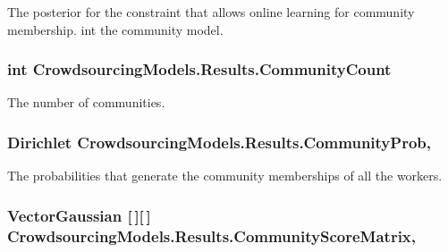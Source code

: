 The posterior for the constraint that allows online learning for community membership. int the community model. 

\hypertarget{class_crowdsourcing_models_1_1_results_a90fd0653bd49b69cc9f12ad7cfb3fa9c}{}
\subsubsection[{Community\+Count}]{\setlength{\rightskip}{0pt plus 5cm}int Crowdsourcing\+Models.\+Results.\+Community\+Count\hspace{0.3cm}{\ttfamily [get]}}\label{class_crowdsourcing_models_1_1_results_a90fd0653bd49b69cc9f12ad7cfb3fa9c}


The number of communities. 

\hypertarget{class_crowdsourcing_models_1_1_results_af44b21781d8413575f1196752ec04851}{}
\subsubsection[{Community\+Prob}]{\setlength{\rightskip}{0pt plus 5cm}Dirichlet Crowdsourcing\+Models.\+Results.\+Community\+Prob\hspace{0.3cm}{\ttfamily [get]}, {}}\label{class_crowdsourcing_models_1_1_results_af44b21781d8413575f1196752ec04851}


The probabilities that generate the community memberships of all the workers. 

\hypertarget{class_crowdsourcing_models_1_1_results_ac7537fa71a408a747852b7970805dc91}{}
\subsubsection[{Community\+Score\+Matrix}]{\setlength{\rightskip}{0pt plus 5cm}Vector\+Gaussian \mbox{[}$\,$\mbox{]}\mbox{[}$\,$\mbox{]} Crowdsourcing\+Models.\+Results.\+Community\+Score\+Matrix\hspace{0.3cm}{\ttfamily [get]}, {}}\label{class_crowdsourcing_models_1_1_results_ac7537fa71a408a747852b7970805dc91}


